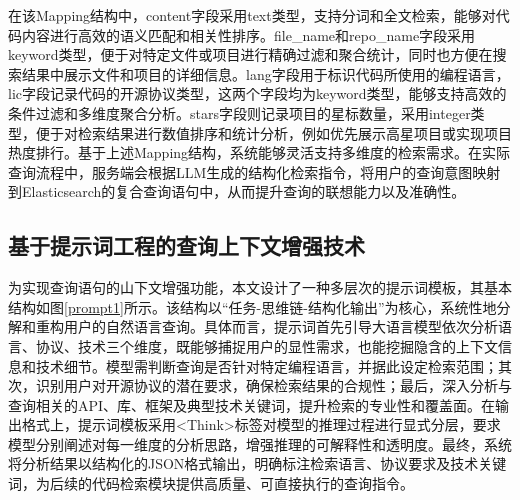 \documentclass[UTF8,a4paper,12pt]{ctexart}
\numberwithin{equation}{section}
\begin{document}
在该Mapping结构中，content字段采用text类型，支持分词和全文检索，能够对代码内容进行高效的语义匹配和相关性排序。file\_name和repo\_name字段采用keyword类型，便于对特定文件或项目进行精确过滤和聚合统计，同时也方便在搜索结果中展示文件和项目的详细信息。lang字段用于标识代码所使用的编程语言，lic字段记录代码的开源协议类型，这两个字段均为keyword类型，能够支持高效的条件过滤和多维度聚合分析。stars字段则记录项目的星标数量，采用integer类型，便于对检索结果进行数值排序和统计分析，例如优先展示高星项目或实现项目热度排行。基于上述Mapping结构，系统能够灵活支持多维度的检索需求。在实际查询流程中，服务端会根据LLM生成的结构化检索指令，将用户的查询意图映射到Elasticsearch的复合查询语句中，从而提升查询的联想能力以及准确性。
\subsection{基于提示词工程的查询上下文增强技术}
为实现查询语句的山下文增强功能，本文设计了一种多层次的提示词模板，其基本结构如图\ref{prompt1}所示。该结构以“任务-思维链-结构化输出”为核心，系统性地分解和重构用户的自然语言查询。具体而言，提示词首先引导大语言模型依次分析语言、协议、技术三个维度，既能够捕捉用户的显性需求，也能挖掘隐含的上下文信息和技术细节。模型需判断查询是否针对特定编程语言，并据此设定检索范围；其次，识别用户对开源协议的潜在要求，确保检索结果的合规性；最后，深入分析与查询相关的API、库、框架及典型技术关键词，提升检索的专业性和覆盖面。在输出格式上，提示词模板采用<Think>标签对模型的推理过程进行显式分层，要求模型分别阐述对每一维度的分析思路，增强推理的可解释性和透明度。最终，系统将分析结果以结构化的JSON格式输出，明确标注检索语言、协议要求及技术关键词，为后续的代码检索模块提供高质量、可直接执行的查询指令。\par
\end{document}
